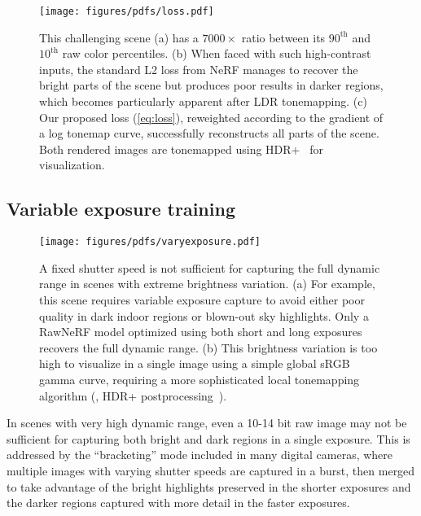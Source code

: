 \begin{figure}
    \centering
    \texttt{[image: figures/pdfs/loss.pdf]}
    \caption{
    This challenging scene (a) has a $7000\times$ ratio between its $90^{\textrm{th}}$ and $10^{\textrm{th}}$ raw color percentiles.
    (b) When faced with such high-contrast inputs, the standard L2 loss from NeRF manages to recover the bright parts of the scene but produces poor results in darker regions, which becomes particularly apparent after LDR tonemapping. (c) Our proposed loss (\ref{eq:loss}), reweighted according to the gradient of a log tonemap curve, successfully reconstructs all parts of the scene. 
    Both rendered images are tonemapped using HDR+~\cite{hdrplus} for visualization.
    }
    \label{fig:l2loss}
\end{figure}



\subsection{Variable exposure training}



\begin{figure}[]
    \centering
    \texttt{[image: figures/pdfs/varyexposure.pdf]}  
    \caption{A fixed shutter speed is not sufficient for capturing the full dynamic range in scenes with extreme brightness variation. (a) For example, this scene requires variable exposure capture to avoid either poor quality in dark indoor regions or blown-out sky highlights. Only a RawNeRF model optimized using both short and long exposures recovers the full dynamic range. (b) This brightness variation is too high to visualize in a single image using a simple global sRGB gamma curve, requiring a more sophisticated local tonemapping algorithm (\eg, HDR+ postprocessing~\cite{hdrplus}).
    }
    \label{fig:shortlong}
\end{figure}







In scenes with very high dynamic range, even a 10-14 bit raw image may not be sufficient for capturing both bright and dark regions in a single exposure. This is addressed by the ``bracketing'' mode included in many digital cameras, where multiple images with varying shutter speeds are captured in a burst, then merged to take advantage of the bright highlights preserved in the shorter exposures and the darker regions captured with more detail in the faster exposures.

